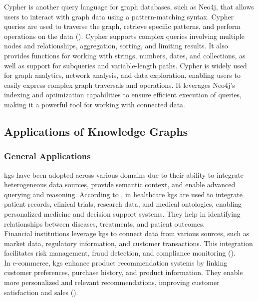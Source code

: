 Cypher is another query language for graph databases, such as Neo4j, that allows users to interact with graph data using a pattern-matching syntax. Cypher queries are used to traverse the graph, retrieve specific patterns, and perform operations on the data (\cite{Francis2018}).
Cypher supports complex queries involving multiple nodes and relationships, aggregation, sorting, and limiting results. It also provides functions for working with strings, numbers, dates, and collections, as well as support for subqueries and variable-length paths.
Cypher is widely used for graph analytics, network analysis, and data exploration, enabling users to easily express complex graph traversals and operations. It leverages Neo4j's indexing and optimization capabilities to ensure efficient execution of queries, making it a powerful tool for working with connected data.

\subsection*{Applications of Knowledge Graphs}

\subsubsection*{General Applications}
\glspl{kg} have been adopted across various domains due to their ability to integrate heterogeneous data sources, provide semantic context, and enable advanced querying and reasoning.
According to \cite{Kapanipathi2020}, in healthcare \glspl{kg} are used to integrate patient records, clinical trials, research data, and medical ontologies, enabling personalized medicine and decision support systems. They help in identifying relationships between diseases, treatments, and patient outcomes.
\\Financial institutions leverage \glspl{kg} to connect data from various sources, such as market data, regulatory information, and customer transactions. This integration facilitates risk management, fraud detection, and compliance monitoring (\cite{Tchechmedjiev2019}).
\\In e-commerce, \glspl{kg} enhance product recommendation systems by linking customer preferences, purchase history, and product information. They enable more personalized and relevant recommendations, improving customer satisfaction and sales (\cite{Zhang2021}).

